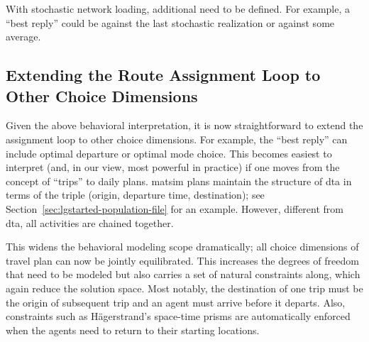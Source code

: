With stochastic network loading, additional  need to be defined.  For example, a
``best reply'' could be against the last stochastic realization\corr{,}{} or
against some average.



\subsection{Extending the Route Assignment Loop to Other Choice Dimensions}
\label{sec:extend-route-assignm}

Given the above behavioral interpretation, it is now straightforward
to extend the assignment loop to other choice dimensions.  For
example, the ``best reply'' can include optimal departure  \citep[e.g.,][]{METROPOLIS,EttemaEtcRoutes-timesIatbr03} \corr{,}{} or
optimal mode choice.  This becomes easiest to interpret (and, in our view, most
powerful in practice)\corr{,}{} if one moves from the concept of ``trips'' to
daily plans.
\gls{matsim} plans maintain the structure of \gls{dta} in terms of the triple
(origin, departure time, destination); see Section~\ref{sec:lgstarted-population-file}
for an
example. However, different from \gls{dta}, all activities are chained together.

This widens the behavioral modeling scope dramatically; all
choice dimensions of  travel plan can now be jointly
equilibrated. This increases the degrees of freedom that 
need to be modeled\corr{,}{} but also carries a set of natural constraints
along, which again reduce the solution space. Most notably, the
destination of one trip must be the origin of  subsequent trip and an agent  must arrive before it departs.
Also, constraints such as H\"agerstrand's space-time prisms
\citep{Haegerstrand1970WhatAboutPeople} are
automatically enforced when the agents need
to return to their starting locations.

